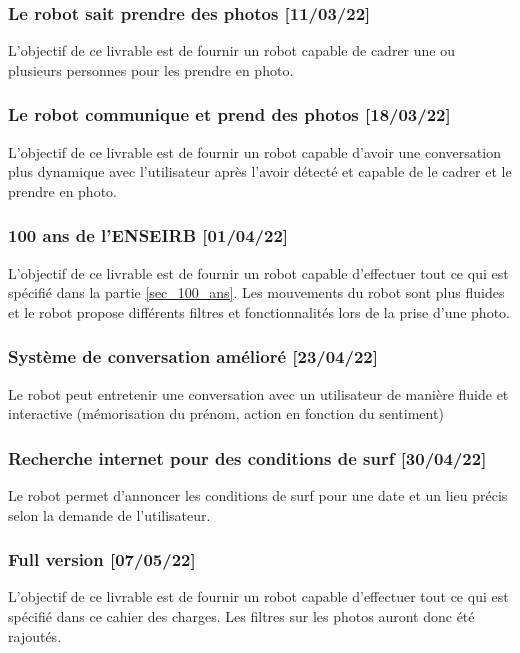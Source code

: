 \subsubsection{Le robot sait prendre des photos [11/03/22]}
L'objectif de ce livrable est de fournir un robot capable de cadrer une ou plusieurs personnes pour les prendre en photo.

\subsubsection{Le robot communique et prend des photos [18/03/22] }
L'objectif de ce livrable est de fournir un robot capable d'avoir une conversation plus dynamique avec l'utilisateur après l'avoir détecté et capable de le cadrer et le prendre en photo.

\subsubsection{100 ans de l'ENSEIRB [01/04/22]}
L'objectif de ce livrable est de fournir un robot capable d'effectuer tout ce qui est spécifié dans la partie \ref{sec_100_ans}.
Les mouvements du robot sont plus fluides et le robot propose différents filtres et fonctionnalités lors de la prise d'une photo.

\subsubsection{Système de conversation amélioré [23/04/22]}
Le robot peut entretenir une conversation avec un utilisateur de manière fluide et interactive (mémorisation du prénom, action en fonction du sentiment)

\subsubsection{Recherche internet pour des conditions de surf [30/04/22]}
Le robot permet d'annoncer les conditions de surf pour une date et un lieu précis selon la demande de l'utilisateur.

\subsubsection{Full version [07/05/22]}
L'objectif de ce livrable est de fournir un robot capable d'effectuer tout ce qui est spécifié dans ce cahier des charges. Les filtres sur les photos auront donc été rajoutés.

\newpage

